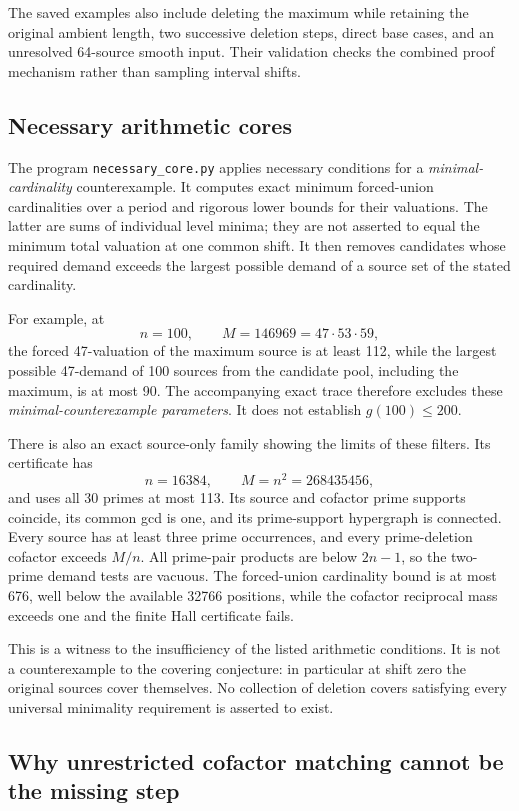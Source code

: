 The saved examples also include deleting the maximum while retaining
the original ambient length, two successive deletion steps, direct
base cases, and an unresolved 64-source smooth input. Their validation
checks the combined proof mechanism rather than sampling interval
shifts.

\subsection{Necessary arithmetic cores}

The program \texttt{necessary\_core.py} applies necessary conditions
for a \emph{minimal-cardinality} counterexample. It computes exact
minimum forced-union cardinalities over a period and rigorous lower
bounds for their valuations. The latter are sums of individual level
minima; they are not asserted to equal the minimum total valuation at
one common shift. It then removes candidates whose required demand
exceeds the largest possible demand of a source set of the stated
cardinality.

For example, at
\[
 n=100,\qquad M=146969=47\cdot53\cdot59,
\]
the forced 47-valuation of the maximum source is at least 112, while
the largest possible 47-demand of 100 sources from the candidate pool,
including the maximum, is at most 90. The accompanying exact trace
therefore excludes these \emph{minimal-counterexample parameters}.
It does not establish \(g(100)\le200\).

There is also an exact source-only family showing the limits of
these filters. Its certificate has
\[
 n=16384,\qquad M=n^2=268435456,
\]
and uses all 30 primes at most 113. Its source and cofactor prime
supports coincide, its common gcd is one, and its prime-support
hypergraph is connected. Every source has at least three prime
occurrences, and every prime-deletion cofactor exceeds \(M/n\).
All prime-pair products are below \(2n-1\), so the two-prime demand
tests are vacuous. The forced-union cardinality bound is at most 676,
well below the available 32766 positions, while the cofactor
reciprocal mass exceeds one and the finite Hall certificate fails.

This is a witness to the insufficiency of the listed arithmetic
conditions. It is not a counterexample to the covering conjecture:
in particular at shift zero the original sources cover themselves.
No collection of deletion covers satisfying every universal
minimality requirement is asserted to exist.

\subsection{Why unrestricted cofactor matching cannot be the missing step}

